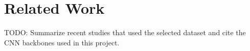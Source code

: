 \section{Related Work}

TODO: Summarize recent studies that used the selected dataset and cite the CNN backbones used in this project.

